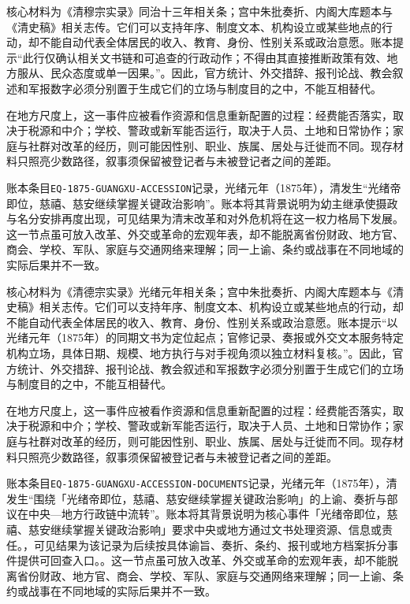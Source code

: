 核心材料为《清穆宗实录》同治十三年相关条；宫中朱批奏折、内阁大库题本与《清史稿》相关志传。它们可以支持年序、制度文本、机构设立或某些地点的行动，却不能自动代表全体居民的收入、教育、身份、性别关系或政治意愿。账本提示“此行仅确认相关文书链和可追查的行政动作；不得由其直接推断政策有效、地方服从、民众态度或单一因果。”。因此，官方统计、外交措辞、报刊论战、教会叙述和军报数字必须分别置于生成它们的立场与制度目的之中，不能互相替代。

在地方尺度上，这一事件应被看作资源和信息重新配置的过程：经费能否落实，取决于税源和中介；学校、警政或新军能否运行，取决于人员、土地和日常协作；家庭与社群对改革的经历，则可能因性别、职业、族属、居处与迁徙而不同。现存材料只照亮少数路径，叙事须保留被登记者与未被登记者之间的差距。

账本条目\texttt{EQ-1875-GUANGXU-ACCESSION}记录，光绪元年（1875年），清发生“光绪帝即位，慈禧、慈安继续掌握关键政治影响”。账本将其背景说明为幼主继承使摄政与名分安排再度出现，可见结果为清末改革和对外危机将在这一权力格局下发展。这一节点虽可放入改革、外交或革命的宏观年表，却不能脱离省份财政、地方官、商会、学校、军队、家庭与交通网络来理解；同一上谕、条约或战事在不同地域的实际后果并不一致。

核心材料为《清德宗实录》光绪元年相关条；宫中朱批奏折、内阁大库题本与《清史稿》相关志传。它们可以支持年序、制度文本、机构设立或某些地点的行动，却不能自动代表全体居民的收入、教育、身份、性别关系或政治意愿。账本提示“以光绪元年（1875年）的同期文书为定位起点；官修记录、奏报或外交文本服务特定机构立场，具体日期、规模、地方执行与对手视角须以独立材料复核。”。因此，官方统计、外交措辞、报刊论战、教会叙述和军报数字必须分别置于生成它们的立场与制度目的之中，不能互相替代。

在地方尺度上，这一事件应被看作资源和信息重新配置的过程：经费能否落实，取决于税源和中介；学校、警政或新军能否运行，取决于人员、土地和日常协作；家庭与社群对改革的经历，则可能因性别、职业、族属、居处与迁徙而不同。现存材料只照亮少数路径，叙事须保留被登记者与未被登记者之间的差距。

账本条目\texttt{EQ-1875-GUANGXU-ACCESSION-DOCUMENTS}记录，光绪元年（1875年），清发生“围绕「光绪帝即位，慈禧、慈安继续掌握关键政治影响」的上谕、奏折与部议在中央—地方行政链中流转”。账本将其背景说明为核心事件「光绪帝即位，慈禧、慈安继续掌握关键政治影响」要求中央或地方通过文书处理资源、信息或责任。，可见结果为该记录为后续按具体谕旨、奏折、条约、报刊或地方档案拆分事件提供可回查入口。。这一节点虽可放入改革、外交或革命的宏观年表，却不能脱离省份财政、地方官、商会、学校、军队、家庭与交通网络来理解；同一上谕、条约或战事在不同地域的实际后果并不一致。

